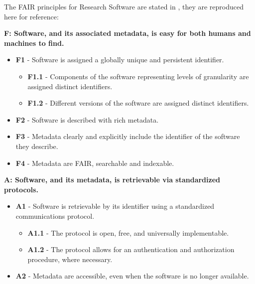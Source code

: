 
The FAIR principles for Research Software are stated in \cite{chue_hong_neil_p_2022_6623556}, they
are reproduced here for reference:

\textbf{F: Software, and its associated metadata, is easy for both humans and machines to find.}

\begin{itemize}
    \item \textbf{F1} - Software is assigned a globally unique and persistent identifier.
    \begin{itemize}
        \item \textbf{F1.1} - Components of the software representing levels of granularity are assigned distinct identifiers.
        \item \textbf{F1.2} - Different versions of the software are assigned distinct identifiers.
    \end{itemize}

    \item \textbf{F2} - Software is described with rich metadata.
    \item \textbf{F3} - Metadata clearly and explicitly include the identifier of the software they describe.
    \item \textbf{F4} - Metadata are FAIR, searchable and indexable.
\end{itemize}

\textbf{A: Software, and its metadata, is retrievable via standardized protocols.}

\begin{itemize}
    \item \textbf{A1} - Software is retrievable by its identifier using a standardized communications protocol.

    \begin{itemize}
        \item \textbf{A1.1} - The protocol is open, free, and universally implementable.
        \item \textbf{A1.2} - The protocol allows for an authentication and authorization procedure, where necessary.
    \end{itemize}

    \item \textbf{A2} - Metadata are accessible, even when the software is no longer available.
\end{itemize}

